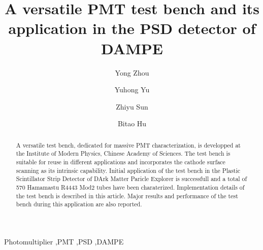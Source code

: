 \documentclass[review,number,sort&compress]{elsarticle}
\begin{document}
\begin{frontmatter}

\title{A versatile PMT test bench and its application in the PSD detector of DAMPE}

\author[imp,lzu,ucas]{Yong Zhou}

\author[imp]{Yuhong Yu}

\author[imp]{Zhiyu Sun}

\author[lzu]{Bitao Hu}

\address[imp]{Institute of Modern Physicas, Chinese Academy of Sciences,  509 Nanchang Road,  Lanzhou,  730000,  P.R.China}
\address[lzu]{School of Nuclear Science and Technology,  Lanzhou University,  222 South Tianshui Road,  Lanzhou,  730000,  P.R.China}
\address[ucas]{Graduate University of the Chinese Academy of Sciences,  19A Yuquan Road,  Beijing,  100049,  P.R.China}

\begin{abstract}

A versatile test bench, dedicated for massive PMT characterization, is developped at the Institute of Modern Physics, Chinese Academy of Sciences.
The test bench is suitable for reuse in different applications and incorporates the cathode surface scanning as its intrinsic capability.
Initial application of the test bench in the Plastic Scintillator Strip Detector of DArk Matter Paricle Explorer is successfull and a total of 570 Hamamastu R4443 Mod2 tubes have been charaterized.
Implementation details of the test bench is described in this article.
Major results and performance of the test bench during this application are also reported. 
\end{abstract}

\begin{keyword}
Photomultiplier
\sep PMT
\sep PSD
\sep DAMPE



\end{keyword}

\end{frontmatter}
\end{document}
